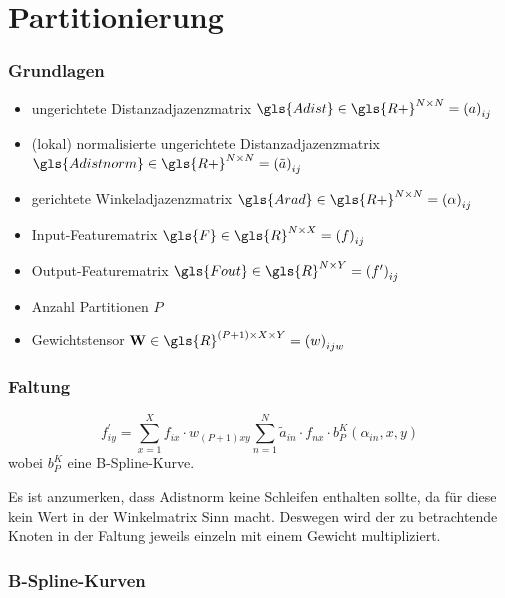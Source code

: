 \newpage

\section{Partitionierung}

\subsubsection{Grundlagen}

\begin{itemize}
  \item ungerichtete Distanzadjazenzmatrix $\gls{Adist} \in \gls{R+}^{N \times N} = {\left(a\right)}_{ij}$
  \item (lokal) normalisierte ungerichtete Distanzadjazenzmatrix $\gls{Adistnorm} \in \gls{R+}^{N \times N} = {\left(\tilde a\right)}_{ij}$
  \item gerichtete Winkeladjazenzmatrix $\gls{Arad} \in \gls{R+}^{N \times N} = {\left(\alpha\right)}_{ij}$
  \item Input-Featurematrix $\gls{F} \in \gls{R}^{N \times X} = {\left(f\right)}_{ij}$
  \item Output-Featurematrix $\gls{Fout} \in \gls{R}^{N \times Y} = {\left(f^{\prime}\right)}_{ij}$
  \item Anzahl Partitionen $P$
  \item Gewichtstensor $\ma{W} \in \gls{R}^{\left(P + 1\right) \times X \times Y} = {\left(w\right)}_{ijw}$
\end{itemize}

\subsubsection{Faltung}

\begin{equation}
  f^{\prime}_{iy} = \sum_{x = 1}^X f_{ix} \cdot w_{\left(P +1\right)xy} \sum_{n = 1}^N \tilde a_{in} \cdot f_{nx} \cdot b^K_P\left(\alpha_{in}, x, y\right)
\end{equation}
wobei $b_P^K$ eine B-Spline-Kurve.

Es ist anzumerken, dass \gls{Adistnorm} keine Schleifen enthalten sollte, da für diese kein Wert in der Winkelmatrix Sinn macht.
Deswegen wird der zu betrachtende Knoten in der Faltung jeweils einzeln mit einem Gewicht multipliziert.


\subsubsection{B-Spline-Kurven}

